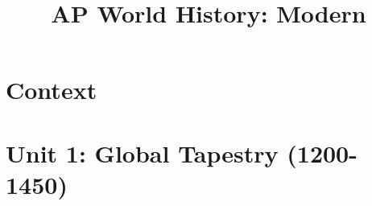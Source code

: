\documentclass{report} %
\title{AP World History: Modern}
\begin{document}
    \maketitle
    \tableofcontents
    \part*{Context}
    
    \part{Unit 1: Global Tapestry (1200-1450)}
    
    
\end{document}
